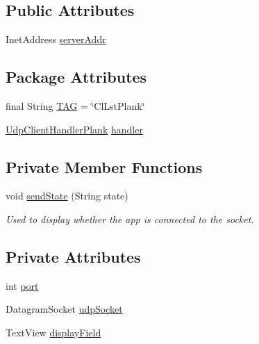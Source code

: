 \subsection*{Public Attributes}
\begin{DoxyCompactItemize}
\item 
Inet\+Address \mbox{\hyperlink{classcom_1_1example_1_1trainawearapplication_1_1_client_listen_plank_ae4ec71dafa5b734e69c3576bda12e0b8}{server\+Addr}}
\end{DoxyCompactItemize}
\subsection*{Package Attributes}
\begin{DoxyCompactItemize}
\item 
final String \mbox{\hyperlink{classcom_1_1example_1_1trainawearapplication_1_1_client_listen_plank_a9807ae2d458f79ff2dad3ffcda8d6cca}{T\+AG}} = \char`\"{}Cl\+Lst\+Plank\char`\"{}
\item 
\mbox{\hyperlink{classcom_1_1example_1_1trainawearapplication_1_1_udp_client_handler_plank}{Udp\+Client\+Handler\+Plank}} \mbox{\hyperlink{classcom_1_1example_1_1trainawearapplication_1_1_client_listen_plank_ac90c43ada4fdc1f7865f8ab39865b980}{handler}}
\end{DoxyCompactItemize}
\subsection*{Private Member Functions}
\begin{DoxyCompactItemize}
\item 
void \mbox{\hyperlink{classcom_1_1example_1_1trainawearapplication_1_1_client_listen_plank_ab7af22341c89f6a1263612df9516d6e6}{send\+State}} (String state)
\begin{DoxyCompactList}\small\item\em Used to display whether the app is connected to the socket. \end{DoxyCompactList}\end{DoxyCompactItemize}
\subsection*{Private Attributes}
\begin{DoxyCompactItemize}
\item 
int \mbox{\hyperlink{classcom_1_1example_1_1trainawearapplication_1_1_client_listen_plank_aa394560dfa0da718f5ca639b82795395}{port}}
\item 
Datagram\+Socket \mbox{\hyperlink{classcom_1_1example_1_1trainawearapplication_1_1_client_listen_plank_a1834dc9b799cdf87ebf89fd34136ccfa}{udp\+Socket}}
\item 
Text\+View \mbox{\hyperlink{classcom_1_1example_1_1trainawearapplication_1_1_client_listen_plank_a2b606ab855a6ec1cabbb5f84a0eb1de0}{display\+Field}}
\end{DoxyCompactItemize}


